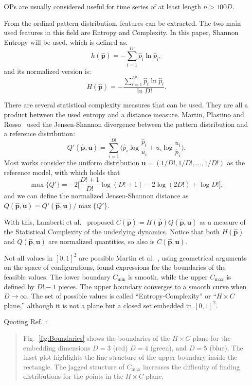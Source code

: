 OPs are usually considered useful for time series of at least length $n>100D$.

From the ordinal pattern distribution, features can be extracted. 
The two main used features in this field are Entropy and Complexity. 
In this paper, Shannon Entropy will be used, which is defined as.
$$
h(\widehat{\bm p})=-\sum_{i=1}^{D!} \widehat{p}_i \ln \widehat{p}_i,
$$
and its normalized version is:
$$
H(\widehat{\bm p})=-\frac{\sum_{i=1}^{D!} \widehat{p}_i  \ln \widehat{p}_i}{\ln D!}.
$$

There are several statistical complexity measures that can be used. 
They are all a product between the used entropy and a distance measure. 
Martin, Plastino and Rosso~\cite{Martin2003} used the Jensen-Shannon divergence between the pattern distribution and a reference distribution:
\begin{equation}
	Q'(\widehat{\bm p}, \bm{u}) = \sum_{i=1}^{D!} \Big(\widehat{p}_i \log\frac{\widehat{p}_i}{u_i} +
	u_i \log\frac{u_i}{\widehat{p}_i}
	\Big).
	\label{eq:JensenShannon}
\end{equation}
Most works consider the uniform distribution $\bm u = (1/D!, 1/D!, \dots, 1/D!)$ as the reference model, with which holds that
$$
\max\{Q'\} = -2\Big[
\frac{D!+1}{D!} \log(D!+1) - 2 \log(2D!) + \log D!
\Big],
$$
and we can define the normalized Jensen-Shannon distance as $Q(\widehat{\bm p}, \bm{u})=Q'(\widehat{\bm p}, \bm{u})/\max\{Q'\}$.

With this, Lamberti et al.~\cite{Lamberti2004} proposed $C(\widehat{\bm p})=H(\widehat{\bm p})Q(\widehat{\bm p}, \bm{u})$ as a measure of the Statistical Complexity of the underlying dynamics.
Notice that both $H(\widehat{\bm p})$ and $Q(\widehat{\bm p}, \bm{u})$ are normalized quantities, so also is $C(\widehat{\bm p}, \bm{u})$. 

Not all values in $[0,1]^2$ are possible
Martin et al.~\cite{GeneralizedStatisticalComplexityMeasuresGeometricalandAnalyticalProperties}, using geometrical arguments on the space of configurations, found expressions for the boundaries of the feasible values.
The lower boundary $C_{\min}$ is smooth, while the upper $C_{\max}$ is defined by $D!-1$ pieces.
The upper boundary converges to a smooth curve when $D\to\infty$.
The set of possible values is called ``Entropy-Complexity'' or ``$H\times C$ plane,'' although it is not a plane but a closed set embedded in $[0,1]^2$.

Quoting Ref.~\cite{WhiteNoiseTestfromOrdinalPatternsintheEntropyComplexityPlane}:
\begin{quote}
Fig.~\ref{fig:Boundaries} shows the boundaries of the $H\times C$ plane for the embedding dimensions $D=3$ (red) $D=4$ (green), and $D=5$ (blue).
The inset plot highlights the fine structure of the upper boundary inside the rectangle.
The jagged structure of $C_{\max}$ increases the difficulty of finding distributions for the points in the $H\times C$ plane.
\end{quote}

